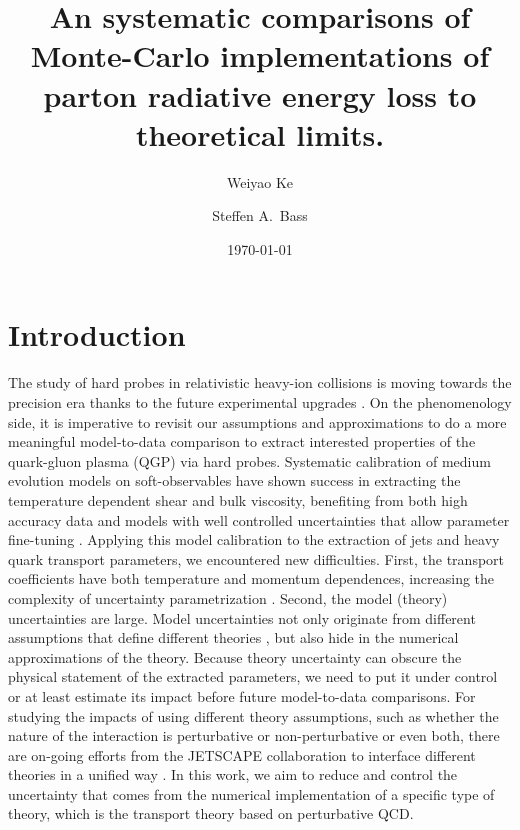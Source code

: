 \documentclass[aps, prc, reprint, amsmath, groupedaddress, nofootinbib]{revtex4-1}
\begin{document}
\title{An systematic comparisons of Monte-Carlo implementations of parton radiative energy loss to theoretical limits.}
\author{Weiyao Ke}
\author{Steffen A.\ Bass}
\date{\today}
\maketitle 

\section{Introduction}
The study of hard probes in relativistic heavy-ion collisions is moving towards the precision era thanks to the future experimental upgrades \cite{ATLAS-Collaboration:2012iwa,Abelevetal:2014dna,STAR:upgrade-hf,Adare:2015kwa,CMS:2017dec}.
On the phenomenology side, it is imperative to revisit our assumptions and approximations to do a more meaningful model-to-data comparison to extract interested properties of the quark-gluon plasma (QGP) via hard probes.
Systematic calibration of medium evolution models on soft-observables have shown success in extracting the temperature dependent shear and bulk viscosity, benefiting from both high accuracy data and models with well controlled uncertainties that allow parameter fine-tuning \cite{Bernhard:2016tnd, Bernhard:2018hnz}.
Applying this model calibration to the extraction of jets and heavy quark transport parameters, we encountered new difficulties. 
First, the transport coefficients have both temperature and momentum dependences, increasing the complexity of uncertainty parametrization \cite{Xu:2017obm}.
Second, the model (theory) uncertainties are large. 
Model uncertainties not only originate from different assumptions that define different theories \cite{CaronHuot:2010bp, Rapp:2018qla}, but also hide in the numerical approximations of the theory.
Because theory uncertainty can obscure the physical statement of the extracted parameters, we need to put it under control or at least estimate its impact before future model-to-data comparisons.
For studying the impacts of using different theory assumptions, such as whether the nature of the interaction is perturbative or non-perturbative or even both, there are on-going efforts from the JETSCAPE collaboration to interface different theories in a unified way \cite{Cao:2017zih, Kauder:2018cdt}.
In this work, we aim to reduce and control the uncertainty that comes from the numerical implementation of a specific type of theory, which is the transport theory based on perturbative QCD.
\end{document}
